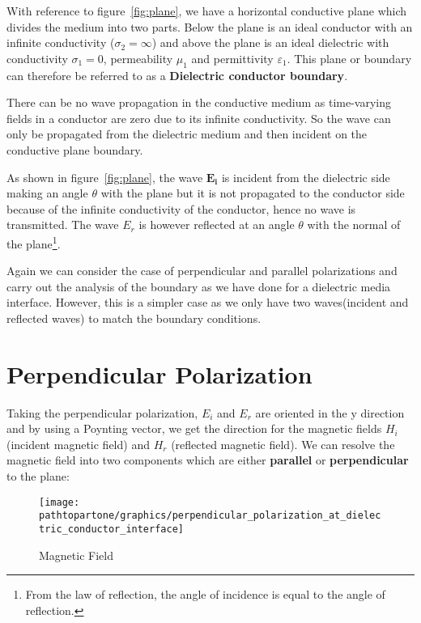 With reference to figure~\ref{fig:plane}, we have a horizontal conductive plane which divides the medium into two parts. Below the plane is an ideal conductor with an infinite conductivity ($\sigma _2 =\infty$) and above the plane is an ideal dielectric with conductivity $\sigma_1 = 0$, permeability $\mu _1$ and	permittivity $ \varepsilon _1$. This plane or boundary can therefore be referred to as a \textbf{Dielectric conductor boundary}.

There can be no wave propagation in the conductive medium as time-varying fields in a conductor are zero due to its infinite conductivity. So the wave can only be propagated from the dielectric medium and then incident on the conductive plane boundary.

As shown in figure~\ref{fig:plane}, the wave $\boldsymbol{E_i}$  is incident from the dielectric side making an angle $ \theta $ with the plane but it is not propagated to the conductor side because of the infinite conductivity of the conductor, hence no wave is transmitted. The wave $E_r$ is however reflected at an angle $ \theta $ with the normal of the plane\footnote{
From the law of reflection, the angle of incidence is equal to the angle of reflection.
}.

Again we can consider the case of perpendicular and parallel polarizations and carry out the analysis of the boundary as we have done for a dielectric media interface. However, this is a simpler case as we only have two waves(incident and reflected waves) to match the boundary conditions.

\section{Perpendicular Polarization}
Taking the perpendicular polarization, $E_i$ and $E_r$ are oriented in the y direction and by using a Poynting vector, we get the direction for the magnetic fields $H_i$ (incident magnetic field) and $H_r$ (reflected magnetic field). We can resolve the magnetic field into two components which are either \textbf{parallel} or \textbf{perpendicular} to the plane:

\begin{figure}[h]
\centering
\texttt{[image: \\pathtopartone/graphics/perpendicular\_polarization\_at\_dielectric\_conductor\_interface]}
\caption{Magnetic Field}
\label{fig:fields}
\end{figure}

